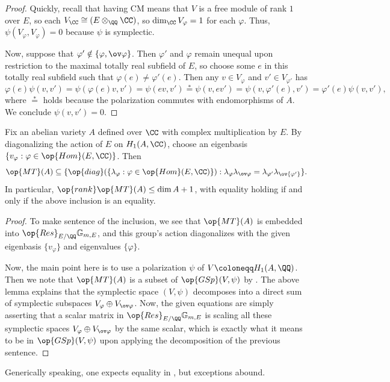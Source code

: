 \documentclass{article}
\begin{document}
\begin{proof}
	Quickly, recall that having CM means that $V$ is a free module of rank $1$ over $E$, so each $V_\CC\cong(E\otimes_\QQ\CC)$, so $\dim_\CC V_\varphi=1$ for each $\varphi$. Thus, $\psi(V_\varphi,V_\varphi)=0$ because $\psi$ is symplectic.

	Now, suppose that $\varphi'\notin\{\varphi,\ov\varphi\}$. Then $\varphi'$ and $\varphi$ remain unequal upon restriction to the maximal totally real subfield of $E$, so choose some $e$ in this totally real subfield such that $\varphi(e)\ne\varphi'(e)$. Then any $v\in V_\varphi$ and $v'\in V_{\varphi'}$ has
	\[\varphi(e)\psi(v,v')=\psi(\varphi(e)v,v')=\psi(ev,v')\stackrel*=\psi(v,ev')=\psi(v,\varphi'(e),v')=\varphi'(e)\psi(v,v'),\]
	where $\stackrel*=$ holds because the polarization commutes with endomorphisms of $A$. We conclude $\psi(v,v')=0$.
\end{proof}
\begin{proposition} \label{prop:lefschetz-cm-mt}
	Fix an abelian variety $A$ defined over $\CC$ with complex multiplication by $E$. By diagonalizing the action of $E$ on $H_1(A,\CC)$, choose an eigenbasis $\{v_\varphi:\varphi\in\op{Hom}(E,\CC)\}$. Then
	\[\op{MT}(A)\subseteq\{\op{diag}(\{\lambda_\varphi:\varphi\in\op{Hom}(E,\CC)\}):\lambda_\varphi\lambda_{\ov\varphi}=\lambda_{{\varphi'}}\lambda_{\ov{\varphi'}}\}.\]
	In particular, $\op{rank}\op{MT}(A)\le\dim A+1$, with equality holding if and only if the above inclusion is an equality.
\end{proposition}
\begin{proof}
	To make sentence of the inclusion, we see that $\op{MT}(A)$ is embedded into $\op{Res}_{E/\QQ}\mathbb G_{m,E}$, and this group's action diagonalizes with the given eigenbasis $\{v_\varphi\}$ and eigenvalues $\{\varphi\}$.

	Now, the main point here is to use a polarization $\psi$ of $V\coloneqq H_1(A,\QQ)$. Then we note that $\op{MT}(A)$ is a subset of $\op{GSp}(V,\psi)$ by . The above lemma explains that the symplectic space $(V,\psi)$ decomposes into a direct sum of symplectic subspaces $V_\varphi\oplus V_{\ov\varphi}$. Now, the given equations are simply asserting that a scalar matrix in $\op{Res}_{E/\QQ}\mathbb G_{m,E}$ is scaling all these symplectic spaces $V_\varphi\oplus V_{\ov\varphi}$ by the same scalar, which is exactly what it means to be in $\op{GSp}(V,\psi)$ upon applying the decomposition of the previous sentence.
\end{proof}
Generically speaking, one expects equality in , but exceptions abound.
\end{document}
